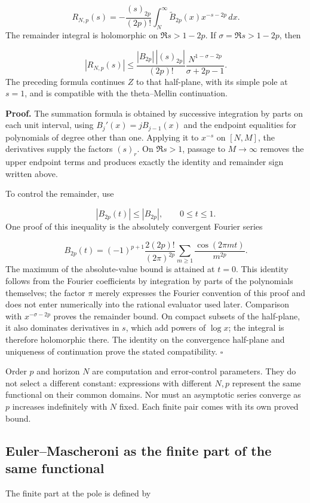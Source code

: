 \[
R_{N,p}(s)=-\frac{(s)_{2p}}{(2p)!}
\int_N^\infty\widetilde B_{2p}(x)x^{-s-2p}\,dx.
\]
The remainder integral is holomorphic on \(\Re s>1-2p\). If \(\sigma=\Re s>1-2p\), then

\[
|R_{N,p}(s)|\leq
\frac{|B_{2p}|\,|(s)_{2p}|}{(2p)!}
\frac{N^{1-\sigma-2p}}{\sigma+2p-1}.
\]
The preceding formula continues \(Z\) to that half-plane, with its simple pole at \(s=1\), and is compatible with the theta–Mellin continuation.

\textbf{Proof.} The summation formula is obtained by successive integration by parts on each unit interval, using \(B_j'(x)=jB_{j-1}(x)\) and the endpoint equalities for polynomials of degree other than one. Applying it to \(x^{-s}\) on \([N,M]\), the derivatives supply the factors \((s)_r\). On \(\Re s>1\), passage to \(M\to\infty\) removes the upper endpoint terms and produces exactly the identity and remainder sign written above.

To control the remainder, use

\[
|B_{2p}(t)|\leq |B_{2p}|,\qquad 0\leq t\leq1.
\]
One proof of this inequality is the absolutely convergent Fourier series

\[
B_{2p}(t)=(-1)^{p+1}\frac{2(2p)!}{(2\pi)^{2p}}
\sum_{m\geq1}\frac{\cos(2\pi mt)}{m^{2p}}.
\]
The maximum of the absolute-value bound is attained at \(t=0\). This identity follows from the Fourier coefficients by integration by parts of the polynomials themselves; the factor \(\pi\) merely expresses the Fourier convention of this proof and does not enter numerically into the rational evaluator used later. Comparison with \(x^{-\sigma-2p}\) proves the remainder bound. On compact subsets of the half-plane, it also dominates derivatives in \(s\), which add powers of \(\log x\); the integral is therefore holomorphic there. The identity on the convergence half-plane and uniqueness of continuation prove the stated compatibility. \hfill\(\square\)

Order \(p\) and horizon \(N\) are computation and error-control parameters. They do not select a different constant: expressions with different \(N,p\) represent the same functional on their common domains. Nor must an asymptotic series converge as \(p\) increases indefinitely with \(N\) fixed. Each finite pair comes with its own proved bound.

\subsection{Euler–Mascheroni as the finite part of the same functional}
The finite part at the pole is defined by

